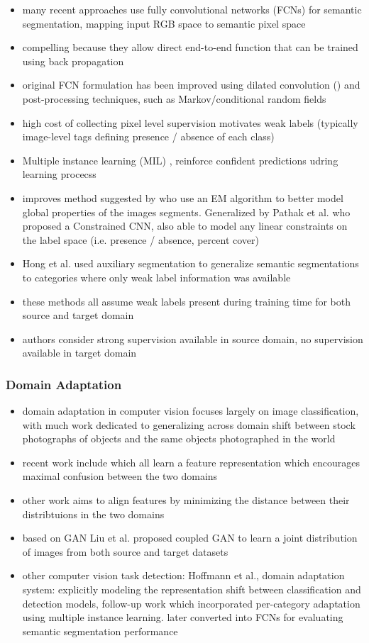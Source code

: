 \begin{itemize}
	\item many recent approaches use fully convolutional networks (FCNs) for semantic segmentation, mapping input RGB space to semantic pixel space
	\item compelling because they allow direct end-to-end function that can be trained using back propagation
	\item original FCN formulation has been improved using dilated convolution () and post-processing techniques, such as Markov/conditional random fields
	\item high cost of collecting pixel level supervision motivates weak labels (typically image-level tags defining presence / absence of each class)
	\item Multiple instance learning (MIL) , reinforce confident predictions udring learning procecss
	\item improves method suggested by  who use an EM algorithm to better model global properties of the images segments. Generalized by Pathak et al. who proposed a Constrained CNN, also able to model any linear constraints on the label space (i.e. presence / absence, percent cover)
	\item Hong et al. used auxiliary segmentation to generalize semantic segmentations to categories where only weak label information was available
	\item these methods all assume weak labels present during training time for both source and target domain
	\item authors consider strong supervision available in source domain, no supervision available in target domain
\end{itemize}

\subsubsection{Domain Adaptation}
\begin{itemize}
	\item domain adaptation in computer vision focuses largely on image classification, with much work dedicated to generalizing across domain shift between stock photographs of objects and the same objects photographed in the world
	\item recent work include  which all learn a feature representation which encourages maximal confusion between the two domains
	\item other work aims to align features by minimizing the distance between their distribtuions in the two domains
	\item based on GAN Liu et al. proposed coupled GAN to learn a joint distribution of images from both source and target datasets
	\item other computer vision task detection: Hoffmann et al., domain adaptation system: explicitly modeling the representation shift between classification and detection models, follow-up work which incorporated per-category adaptation using multiple instance learning. later converted into FCNs for evaluating semantic segmentation performance
\end{itemize}

